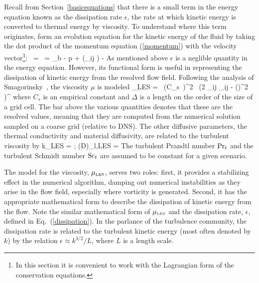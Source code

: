 \documentclass[11pt]{book}
\begin{document}
Recall from Section~\ref{basicequations} that there is a small term in the energy equation
known as the dissipation rate $\epsilon$,
the rate at which kinetic energy is converted to thermal energy by viscosity.
To understand where this term originates, form an evolution equation for the kinetic energy of the fluid by
taking the dot product of the momentum equation (\ref{momentum}) with the velocity vector\footnote{In this section
it is convenient to work with the Lagrangian form of the conservation equations. }:
\be \rho \,  \cdot \bu = \rho  \,  = \rho \bof_b \cdot \bu - \nabla p \cdot \bu + \nabla \cdot (\btau_{ij} \cdot \bu) - \epsilon \ee
As mentioned above $\epsilon$ is a neglible quantity in the energy equation. However, its functional form
is useful in representing the dissipation of kinetic energy from the resolved flow field.
Following the analysis of Smagorinsky~\cite{Smagorinsky:1}, the viscosity $\mu$ is modeled
\be \mu_{\hbox{\tiny LES}} = \rho \, (C_s\, \Delta)^2 \,
   \left(2 \; \overline{\bS}_{ij} \cdot \overline{\bS}_{ij} -  (\nabla \cdot \overline{\bu})^2 \right)^\ha \ee
where $C_s$ is an empirical constant and $\Delta$ is a length on the
order of the size of a grid cell.
The bar above the various quantities denotes that these are the resolved values, meaning
that they are computed from the numerical solution sampled on a coarse grid (relative to DNS).
The other diffusive parameters,
the thermal conductivity and material diffusivity, are related to the turbulent viscosity by
\be k_{\hbox{\tiny LES}} = 
\quad ; \quad
 (\rho D)_{l,\hbox{\tiny LES}} = \ee
The turbulent Prandtl number $\hbox{Pr}_t$ and the turbulent Schmidt number $\hbox{Sc}_t$ are assumed to be
constant for a given scenario.

The model for the viscosity, $\mu_{\hbox{\tiny LES}}$, serves two roles: first, it provides a stabilizing
effect in the numerical
algorithm, damping out numerical instabilities as they arise in the flow field, especially where vorticity is
generated. Second, it has the appropriate mathematical form to describe the dissipation of kinetic energy from the flow.
Note the similar mathematical form of $\mu_{\hbox{\tiny LES}}$ and
the dissipation rate, $\epsilon$, defined in Eq.~(\ref{dissipation}).
In the parlance of the turbulence community, the dissipation
rate is related to the turbulent kinetic energy (most often denoted by $k$) by the
relation $\epsilon \approx k^{3/2}/L$, where $L$ is a length scale.
\end{document}
